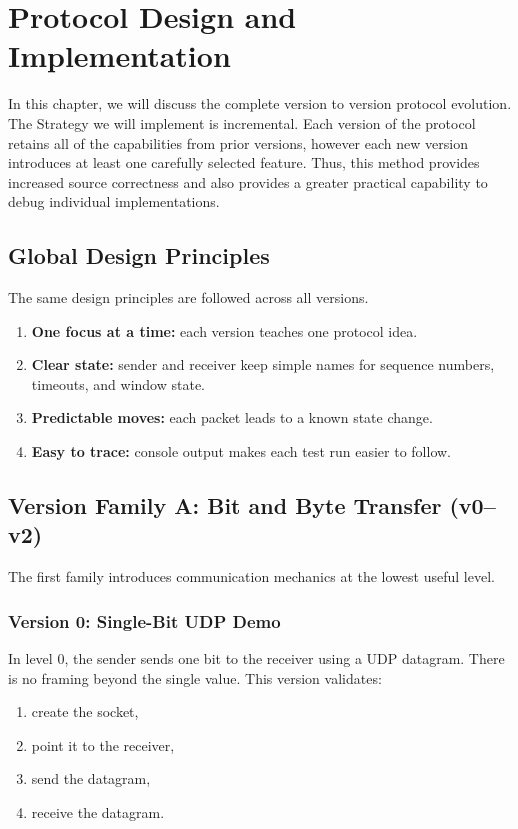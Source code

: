 \chapter{Protocol Design and Implementation}

In this chapter, we will discuss the complete version to version protocol
evolution. The Strategy we will implement is incremental. Each version of the
protocol retains all of the capabilities from prior versions, however each new
version introduces at least one carefully selected feature. Thus, this method
provides increased source correctness and also provides a greater practical
capability to debug individual implementations.

\section{Global Design Principles}
The same design principles are followed across all versions.

\begin{enumerate}
    \item \textbf{One focus at a time:} each version teaches one protocol idea.
    \item \textbf{Clear state:} sender and receiver keep simple names for
    sequence numbers, timeouts, and window state.
    \item \textbf{Predictable moves:} each packet leads to a known state
    change.
    \item \textbf{Easy to trace:} console output makes each test run easier to
    follow.
\end{enumerate}

\clearpage
\section{Version Family A: Bit and Byte Transfer (v0--v2)}
The first family introduces communication mechanics at the lowest useful level.

\subsection{Version 0: Single-Bit UDP Demo}
In level 0, the sender sends one bit to the receiver using a UDP datagram.
There is no framing beyond the single value. This version validates:

\begin{enumerate}
    \item create the socket,
    \item point it to the receiver,
    \item send the datagram,
    \item receive the datagram.
\end{enumerate}

